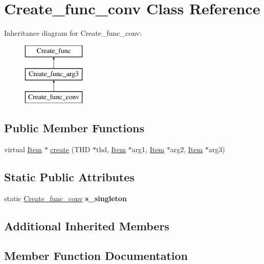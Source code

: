 \hypertarget{classCreate__func__conv}{}\section{Create\+\_\+func\+\_\+conv Class Reference}
\label{classCreate__func__conv}
Inheritance diagram for Create\+\_\+func\+\_\+conv\+:\begin{figure}[H]
\begin{center}
\leavevmode
\includegraphics[height=3.000000cm]{classCreate__func__conv}
\end{center}
\end{figure}
\subsection*{Public Member Functions}
\begin{DoxyCompactItemize}
\item 
virtual \mbox{\hyperlink{classItem}{Item}} $\ast$ \mbox{\hyperlink{classCreate__func__conv_ae2f9cbde413599bca4056f0b53196c4f}{create}} (T\+HD $\ast$thd, \mbox{\hyperlink{classItem}{Item}} $\ast$arg1, \mbox{\hyperlink{classItem}{Item}} $\ast$arg2, \mbox{\hyperlink{classItem}{Item}} $\ast$arg3)
\end{DoxyCompactItemize}
\subsection*{Static Public Attributes}
\begin{DoxyCompactItemize}
\item 
\mbox{\label{classCreate__func__conv_a6095a43bd09b64db57da4bcd82c59eed}} 
static \mbox{\hyperlink{classCreate__func__conv}{Create\+\_\+func\+\_\+conv}} {\bfseries s\+\_\+singleton}
\end{DoxyCompactItemize}
\subsection*{Additional Inherited Members}


\subsection{Member Function Documentation}
\mbox{\label{classCreate__func__conv_ae2f9cbde413599bca4056f0b53196c4f}} 

